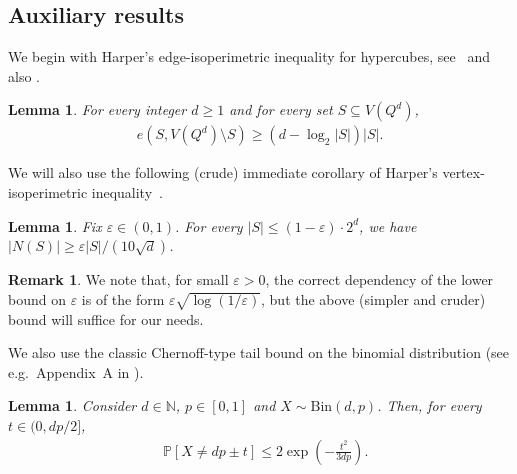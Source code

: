 \documentclass{article}
\newtheorem{corollary}[thm]{Corollary}
\newtheorem{lemma}[thm]{Lemma}
\theoremstyle{definition}
\newtheorem{remark}[thm]{Remark}
\newcommand{\eps}{\varepsilon}
\newcommand{\sahc}[1]{{\color{teal}{ [~Sahar:\ }\emph{#1}\textbf{~]}}}
\newcommand{\ben}[1]{{\color{orange}{ [~Benny:\ }\emph{#1}\textbf{~]}}}
\begin{document}
\subsection{Auxiliary results}
We begin with Harper's edge-isoperimetric inequality for hypercubes, see~\cite{H64} and also \cite{B67,H76,L64}.
\begin{lemma}\label{l: Harper edge}
For every integer $d \ge 1$ and for every set $S\subseteq V(Q^d)$,
\begin{align*}
e(S,V(Q^d)\setminus S)\ge \left(d-\log_2|S|\right) |S|.
\end{align*}
\end{lemma}

We will also use the following (crude) immediate corollary of Harper's vertex-isoperimetric inequality~\cite{H66}.
\begin{lemma}\label{l: harper vertex}
Fix $\eps\in (0,1)$. For every $|S|\le (1-\eps)\cdot 2^{d}$, we have $|N(S)|\ge \eps|S|/(10\sqrt{d})$. 
\end{lemma}
\begin{remark}
    We note that, for small $\eps>0$, the correct dependency of the lower bound on $\eps$ is of the form $\eps\sqrt{\log(1/\eps)}$, but the above (simpler and cruder) bound will suffice for our needs.
\end{remark}

We also use the classic Chernoff-type tail bound on the binomial distribution (see e.g.~Appendix~A in \cite{AS16}).
\begin{lemma}\label{l: chernoff}
Consider $d\in \mathbb{N}$, $p\in [0,1]$ and $X\sim \mathrm{Bin}(d,p)$. Then, for every $t\in (0,dp/2]$, 
\begin{align*}
    &\mathbb{P}\left[X\neq dp\pm t\right]\le 2\exp\left(-\frac{t^2}{3dp}\right).
\end{align*}
\end{lemma}
\end{document}
